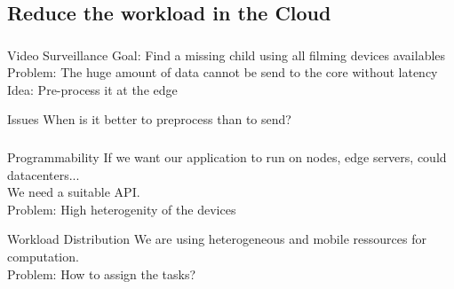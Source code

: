 \documentclass[utf8,xcolor=table, page number]{earlywinter}
\begin{document}
\subsection{Reduce the workload in the Cloud}
\begin{frame}
  \frametitle{\secname}
  \framesubtitle{\subsecname}

  \begin{exampleblock}{Video Surveillance}
    Goal: Find a missing child using all filming devices availables\\
    Problem: The huge amount of data cannot be send to the core without latency\\
    Idea: Pre-process it at the edge
  \end{exampleblock}
  
  \begin{alertblock}{Issues}
    When is it better to preprocess than to send?
  \end{alertblock}

\end{frame}

\begin{frame}
  \frametitle{\secname}
  \framesubtitle{\subsecname}
  \begin{alertblock}{Programmability}
    If we want our application to run on nodes, edge servers, could datacenters...\\
    We need a suitable API.\\
    Problem: High heterogenity of the devices
  \end{alertblock}

  \begin{alertblock}{Workload Distribution}
    We are using heterogeneous and mobile ressources for computation.\\
    Problem: How to assign the tasks?
  \end{alertblock}
  
\end{frame}
\end{document}
